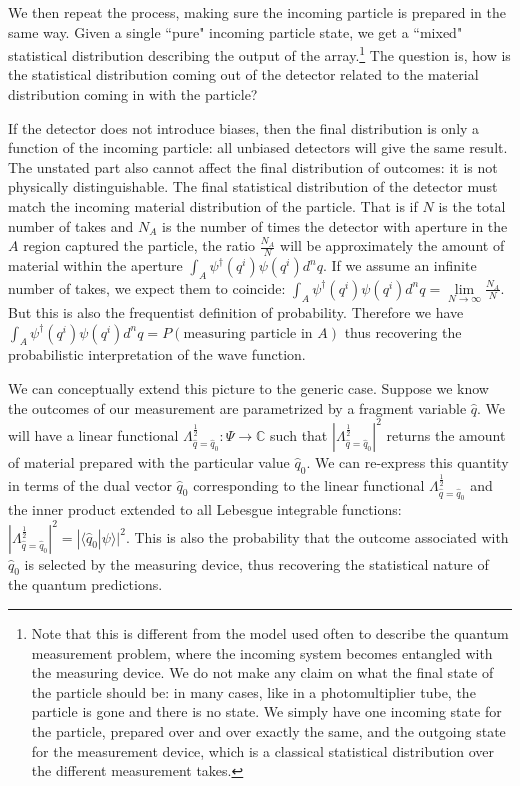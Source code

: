 \documentclass[smallextended]{svjour3}
\numberwithin{equation}{section}
\theoremstyle{definition}
\begin{document}
We then repeat the process, making sure the incoming particle is prepared in the same way. Given a single ``pure" incoming particle state, we get a ``mixed" statistical distribution describing the output of the array.\footnote{Note that this is different from the model used often to describe the quantum measurement problem, where the incoming system becomes entangled with the measuring device. We do not make any claim on what the final state of the particle should be: in many cases, like in a photomultiplier tube, the particle is gone and there is no state. We simply have one incoming state for the particle, prepared over and over exactly the same, and the outgoing state for the measurement device, which is a classical statistical distribution over the different measurement takes.} The question is, how is the statistical distribution coming out of the detector related to the material distribution coming in with the particle?

If the detector does not introduce biases, then the final distribution is only a function of the incoming particle: all unbiased detectors will give the same result. The unstated part also cannot affect the final distribution of outcomes: it is not physically distinguishable. The final statistical distribution of the detector must match the incoming material distribution of the particle. That is if $N$ is the total number of takes and $N_A$ is the number of times the detector with aperture in the $A$ region captured the particle, the ratio $\frac{N_A}{N}$ will be approximately the amount of material within the aperture $\int_A \psi^\dagger(q^i) \psi(q^i) d^nq$. If we assume an infinite number of takes, we expect them to coincide: $\int_A \psi^\dagger(q^i) \psi(q^i) d^nq = \lim\limits_{N\rightarrow\infty} \frac{N_A}{N}$. But this is also the frequentist definition of probability. Therefore we have $\int_A \psi^\dagger(q^i) \psi(q^i) d^nq = P(\textrm{measuring particle in } A)$ thus recovering the probabilistic interpretation of the wave function.

We can conceptually extend this picture to the generic case. Suppose we know the outcomes of our measurement are parametrized by a fragment variable $\hat{q}$. We will have a linear functional $\Lambda^{\frac{1}{2}}_{\hat{q}=\hat{q}_0} : \Psi \rightarrow \mathbb{C}$ such that $|\Lambda^{\frac{1}{2}}_{\hat{q}=\hat{q}_0}|^2$ returns the amount of material prepared with the particular value $\hat{q}_0$. We can re-express this quantity in terms of the dual vector $\hat{q}_0$ corresponding to the linear functional $\Lambda^{\frac{1}{2}}_{\hat{q}=\hat{q}_0}$ and the inner product extended to all Lebesgue integrable functions: $|\Lambda^{\frac{1}{2}}_{\hat{q}=\hat{q}_0}|^2 = |\langle \hat{q}_0 | \psi \rangle|^2 $. This is also the probability that the outcome associated with $\hat{q}_0$ is selected by the measuring device, thus recovering the statistical nature of the quantum predictions. 
\end{document}
